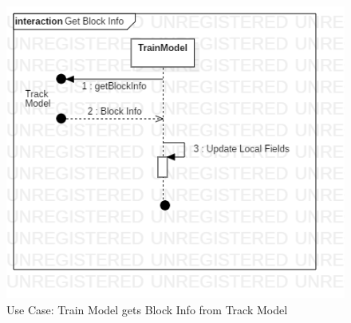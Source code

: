 \documentclass{article}
\begin{document}
    \begin{figure}[H]
        \centering
        \includegraphics[width=\textwidth]{./TrainModel/GetBlockInfo.png}
        \caption{Use Case: Train Model gets Block Info from Track Model}
        \label{fig:Train Model Block Info}
    \end{figure}
\end{document}
